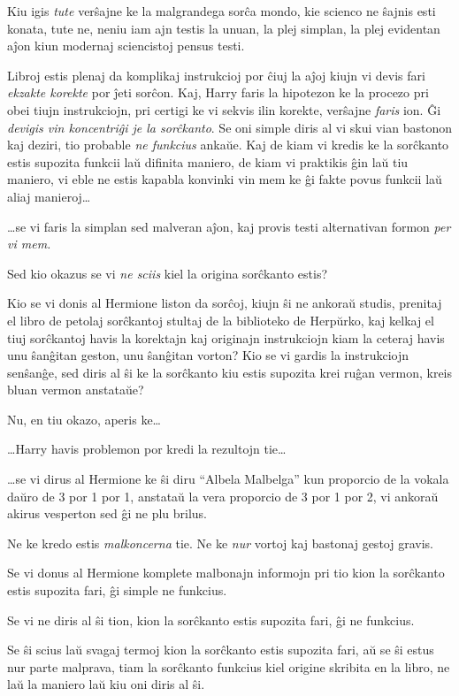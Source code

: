 Kiu igis \emph{tute} verŝajne ke la malgrandega sorĉa mondo, kie
scienco ne ŝajnis esti konata, tute ne, neniu iam ajn testis la unuan,
la plej simplan, la plej evidentan aĵon kiun modernaj sciencistoj
pensus testi.

Libroj estis plenaj da komplikaj instrukcioj por ĉiuj la aĵoj kiujn vi
devis fari \emph{ekzakte korekte} por ĵeti sorĉon. Kaj, Harry faris la
hipotezon ke la procezo pri obei tiujn instrukciojn, pri certigi ke vi
sekvis ilin korekte, verŝajne \emph{faris} ion. Ĝi \emph{devigis vin
  koncentriĝi je la sorĉkanto}. Se oni simple diris al vi skui vian
bastonon kaj deziri, tio probable \emph{ne funkcius} ankaŭe. Kaj de kiam vi
kredis ke la sorĉkanto estis supozita funkcii laŭ difinita maniero, de
kiam vi praktikis ĝin laŭ tiu maniero, vi eble ne estis kapabla
konvinki vin mem ke ĝi fakte povus funkcii laŭ aliaj manieroj\ldots

\ldots{}se vi faris la simplan sed malveran aĵon, kaj provis testi
alternativan formon \emph{per vi mem.}

Sed kio okazus se vi \emph{ne sciis} kiel la origina sorĉkanto estis?

Kio se vi donis al Hermione liston da sorĉoj, kiujn ŝi ne ankoraŭ
studis, prenitaj el libro de petolaj sorĉkantoj stultaj de la
biblioteko de Herpŭrko, kaj kelkaj el tiuj sorĉkantoj havis la
korektajn kaj originajn instrukciojn kiam la ceteraj havis unu ŝanĝitan
geston, unu ŝanĝitan vorton? Kio se vi gardis la instrukciojn senŝanĝe,
sed diris al ŝi ke la sorĉkanto kiu estis supozita krei ruĝan vermon,
kreis bluan vermon anstataŭe?

Nu, en tiu okazo, aperis ke\ldots{}

\ldots{}Harry havis problemon por kredi la rezultojn tie\ldots{}

\ldots{}se vi dirus al Hermione ke ŝi diru ``Albela Malbelga'' kun
proporcio de la vokala daŭro de 3 por 1 por 1, anstataŭ la vera
proporcio de 3 por 1 por 2, vi ankoraŭ akirus vesperton sed ĝi ne plu
brilus.

Ne ke kredo estis \emph{malkoncerna} tie. Ne ke \emph{nur} vortoj kaj bastonaj gestoj gravis.

Se vi donus al Hermione komplete malbonajn informojn pri tio kion la
sorĉkanto estis supozita fari, ĝi simple ne funkcius.

Se vi ne diris al ŝi tion, kion la sorĉkanto estis supozita fari, ĝi ne funkcius.

Se ŝi scius laŭ svagaj termoj kion la sorĉkanto estis supozita fari,
aŭ se ŝi estus nur parte malprava, tiam la sorĉkanto funkcius kiel
origine skribita en la libro, ne laŭ la maniero laŭ kiu oni diris al
ŝi.

